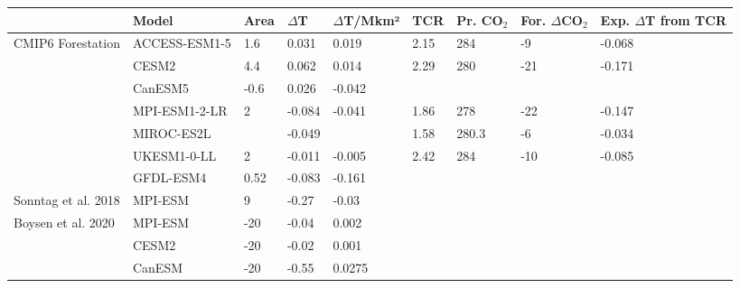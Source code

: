 \documentclass[]{article}
\begin{document}
\begin{table}[]
\begin{tabular}{ll|lllllll}
\hline
                     & Model         & Area & $\Delta$T & $\Delta$T/Mkm² & TCR & Pr. CO$_2$ & For. $\Delta$CO$_2$ & Exp. $\Delta$T from TCR \\ \hline
CMIP6 Forestation    & ACCESS-ESM1-5 & 1.6          & 0.031     & 0.019   & 2.15    & 284               & -9                        & -0.068                         \\
                     & CESM2         & 4.4          & 0.062     & 0.014   & 2.29    & 280               & -21                       & -0.171                         \\
                     & CanESM5       & -0.6         & 0.026     & -0.042  &         &                   &                           &                                \\
                     & MPI-ESM1-2-LR & 2            & -0.084    & -0.041  & 1.86    & 278               & -22                       & -0.147                         \\
                     & MIROC-ES2L    &              & -0.049    &         & 1.58    & 280.3             & -6                        & -0.034                         \\
                     & UKESM1-0-LL   & 2            & -0.011    & -0.005  & 2.42    & 284               & -10                       & -0.085                         \\
                     & GFDL-ESM4     & 0.52         & -0.083    & -0.161  &         &                   &                           &                                \\ \hline
Sonntag et al. 2018 & MPI-ESM       & 9            & -0.27     & -0.03   &         &                   &                           &                                \\ \hline
Boysen et al. 2020 & MPI-ESM       & -20          & -0.04     & 0.002   &         &                   &                           &                                \\
                     & CESM2         & -20          & -0.02     & 0.001   &         &                   &                           &                                \\
                     & CanESM        & -20          & -0.55     & 0.0275  &         &                   &                           &                                \\

\end{tabular}
\end{table}
\end{document}

